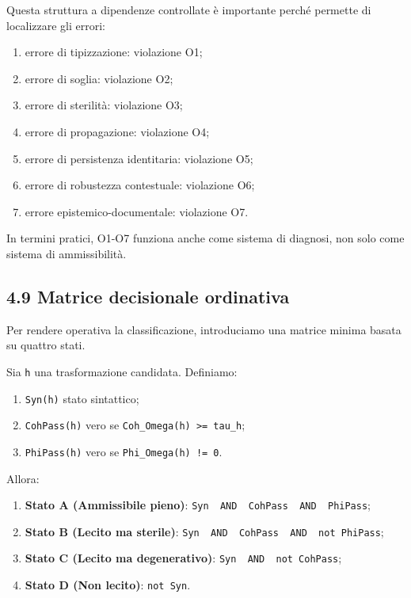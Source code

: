 Questa struttura a dipendenze controllate è importante perché permette di localizzare gli errori:

\begin{enumerate}
\def\labelenumi{\arabic{enumi}.}
\tightlist
\item
  errore di tipizzazione: violazione O1;
\item
  errore di soglia: violazione O2;
\item
  errore di sterilità: violazione O3;
\item
  errore di propagazione: violazione O4;
\item
  errore di persistenza identitaria: violazione O5;
\item
  errore di robustezza contestuale: violazione O6;
\item
  errore epistemico-documentale: violazione O7.
\end{enumerate}

In termini pratici, O1-O7 funziona anche come sistema di diagnosi, non solo come sistema di ammissibilità.

\subsection{4.9 Matrice decisionale ordinativa}

Per rendere operativa la classificazione, introduciamo una matrice minima basata su quattro stati.

Sia \texttt{h} una trasformazione candidata. Definiamo:

\begin{enumerate}
\def\labelenumi{\arabic{enumi}.}
\tightlist
\item
  \texttt{Syn(h)} stato sintattico;
\item
  \texttt{CohPass(h)} vero se \texttt{Coh\_Omega(h)\ \textgreater{}=\ tau\_h};
\item
  \texttt{PhiPass(h)} vero se \texttt{Phi\_Omega(h)\ !=\ 0}.
\end{enumerate}

Allora:

\begin{enumerate}
\def\labelenumi{\arabic{enumi}.}
\tightlist
\item
  \textbf{Stato A (Ammissibile pieno)}: \texttt{Syn\ \ AND\ \ CohPass\ \ AND\ \ PhiPass};
\item
  \textbf{Stato B (Lecito ma sterile)}: \texttt{Syn\ \ AND\ \ CohPass\ \ AND\ \ not\ PhiPass};
\item
  \textbf{Stato C (Lecito ma degenerativo)}: \texttt{Syn\ \ AND\ \ not\ CohPass};
\item
  \textbf{Stato D (Non lecito)}: \texttt{not\ Syn}.
\end{enumerate}

